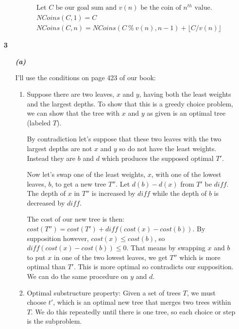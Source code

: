 \documentclass{article}
\begin{document}
\begin{enumerate}
\begin{enumerate}
			\begin{align*}
			& \text{Let $C$ be our goal sum and $v(n)$ be the coin of $n^{th}$ value.} \\
			& NCoins(C,1) = C \\
			& NCoins(C,n) = NCoins(C\ \%\ v(n), n-1) + \lfloor C/v(n) \rfloor
			\end{align*}

		\end{enumerate}

		\item[\textbf{3}]

		\begin{enumerate}

			\item[\textbf{\emph{(a)}}]

			I'll use the conditions on page 423 of our book:

				\begin{enumerate}
					\item 
						Suppose there are two leaves, $x$ and $y$, having both the least
						weights and the largest depths. To show that this is a greedy
						choice problem, we can show that the tree with $x$ and $y$ as
						given is an optimal tree (labeled $T$).

						By contradiction let's suppose that these two leaves with the two
						largest depths are not $x$ and $y$ so do not have the least
						weights. Instead they are $b$ and $d$ which produces the supposed
						optimal $T'$.

						Now let's swap one of the least weights, $x$, with one of the
						lowest leaves, $b$, to get a new tree $T''$. Let $d(b) - d(x)$ from
						$T'$ be $diff$. The depth of $x$ in $T''$ is increased by $diff$
						while the depth of $b$ is decreased by $diff$.

						The cost of our new tree is then: $cost(T'') = cost(T') +
						diff(cost(x) - cost(b))$. By supposition however, $cost(x) \leq
						cost(b)$, so $diff(cost(x) - cost(b)) \leq 0$. That means by
						swapping $x$ and $b$ to put $x$ in one of the two lowest leaves, we
						get $T''$ which is more optimal than $T'$. This is more optimal so
						contradicts our supposition. We can do the same procedure on $y$
						and $d$.

					\item Optimal substructure property: Given a set of trees $T$, we
						must choose $t'$, which is an optimal new tree that merges two
						trees within $T$. We do this repeatedly until there is one tree, so
						each choice or step is the subproblem.


\end{enumerate}
\end{enumerate}
\end{enumerate}
\end{document}
